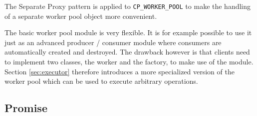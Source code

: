 The Separate Proxy pattern  is applied to \lstinline!CP_WORKER_POOL! to make the handling of a separate worker pool object more convenient.

The basic worker pool module is very flexible.
It is for example possible to use it just as an advanced producer / consumer module where consumers are automatically created and destroyed.
The drawback however is that clients need to implement two classes, the worker and the factory, to make use of the module.
Section \ref{sec:executor} therefore introduces a more specialized version of the worker pool which can be used to execute arbitrary operations.



% 
% 
% 
% 
% 
% 

\subsection{Promise}
\label {sec:promise}


